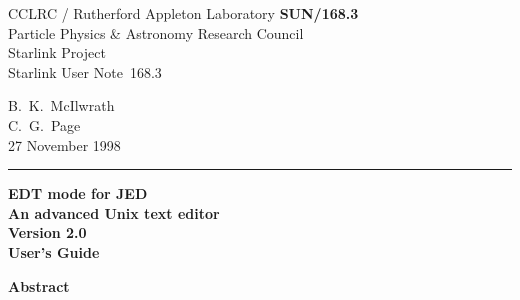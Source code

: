 \documentclass[twoside,11pt]{article}
\newcommand{\stardoccategory}   {Starlink User Note}
\newcommand{\stardocinitials}   {SUN}
\newcommand{\stardocnumber}     {168.3}
\newcommand{\stardocauthors}    {B.\ K.\ McIlwrath\\C.\ G.\ Page}
\newcommand{\stardocversion}    {Version 2.0}
\newcommand{\stardocdate}       {27 November 1998}
\newcommand{\stardoctitle}      {EDT mode for JED\\[2ex]
                                An advanced Unix text editor}
\newcommand{\stardocmanual}    {User's Guide}
\newcommand{\stardocname}{\stardocinitials /\stardocnumber}
\newenvironment{latexonly}{}{}
\begin{document}
\thispagestyle{empty}

\begin{latexonly}
   CCLRC / {\sc Rutherford Appleton Laboratory} \hfill {\bf \stardocname}\\
   {\large Particle Physics \& Astronomy Research Council}\\
   {\large Starlink Project\\}
   {\large \stardoccategory\ \stardocnumber}
   \begin{flushright}
   \stardocauthors\\
   \stardocdate
   \end{flushright}
   \vspace{-4mm}
   \rule{\textwidth}{0.5mm}
   \vspace{5mm}
   \begin{center}
   {\Huge\bf  \stardoctitle \\ [2.5ex]}
   {\LARGE\bf \stardocversion \\ [4ex]}
   {\Huge\bf  \stardocmanual}
   \end{center}
   \vspace{5mm}


   \vspace{10mm}
   \begin{center}
      {\Large\bf Abstract}
   \end{center}
\end{latexonly}
\end{document}
